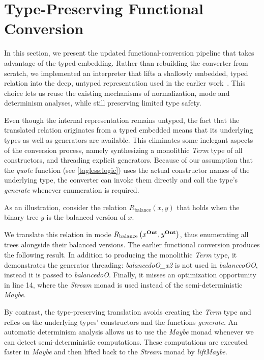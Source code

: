

\section{Type-Preserving Functional Conversion}
\label{contrib:translator}

In this section, we present the updated functional-conversion pipeline that takes advantage of the typed \mk embedding. 
Rather than rebuilding the converter from scratch, we implemented an interpreter that lifts a shallowly embedded, typed relation into the deep, untyped representation used in the earlier work~\cite{engel2023translation}. 
This choice lets us reuse the existing mechanisms of normalization, mode and determinism analyses, while still preserving limited type safety. 

Even though the internal representation remains untyped, the fact that the translated relation originates from a typed embedded means that its underlying \haskell types as well as generators are available. 
This eliminates some inelegant aspects of the conversion process, namely synthesizing a monolithic \emph{Term} type of all constructors, and threading explicit generators. 
Because of our assumption that the \emph{quote} function (see \ref{tagless:logic}) uses the actual constructor names of the underlying type, the converter can invoke them directly and call the type's \emph{generate} whenever enumeration is required.

As an illustration, consider the relation $R_{\text{balance}}(x, y)$ that holds when the binary tree $y$ is the balanced version of $x$. 


We translate this relation in mode  $R_{\text{balance}}\left( x^{\operatorname{\mathbf{Out}}}, y^{\operatorname{\mathbf{Out}}} \right)$, thus enumerating all trees alongside their balanced versions. 
The earlier functional conversion produces the following result. 
In addition to producing the monolithic \emph{Term} type, it demonstrates the generator threading: \emph{balancedoO\_x2} is not used in \emph{balanceoOO}, instead it is passed to \emph{balancedoO}.
Finally, it misses an optimization opportunity in line 14, where the \emph{Stream} monad is used instead of the semi-deterministic \emph{Maybe}. 


By contrast, the type-preserving translation avoids creating the \emph{Term} type and relies on the underlying types' constructors and the functions \emph{generate}.
An automatic determinism analysis allows us to use the \emph{Maybe} monad whenever we can detect semi-deterministic computations. 
These computations are executed faster in \emph{Maybe} and then lifted back to the \emph{Stream} monad by \emph{liftMaybe}. 


